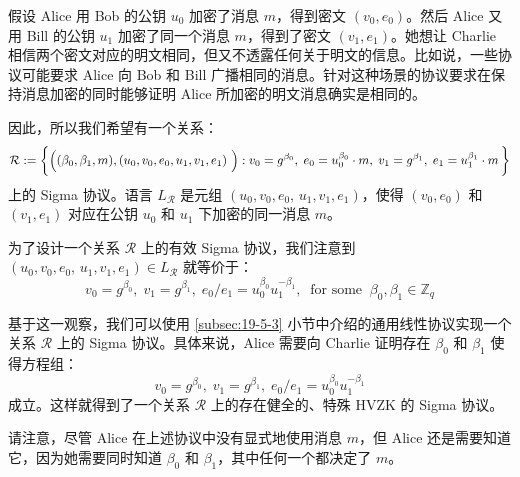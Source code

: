 \begin{example}[明文相等]
假设 Alice 用 Bob 的公钥 $u_0$ 加密了消息 $m$，得到密文 $(v_0,e_0)$。然后 Alice 又用 Bill 的公钥 $u_1$ 加密了同一个消息 $m$，得到了密文 $(v_1,e_1)$。她想让 Charlie 相信两个密文对应的明文相同，但又不透露任何关于明文的信息。比如说，一些协议可能要求 Alice 向 Bob 和 Bill 广播相同的消息。针对这种场景的协议要求在保持消息加密的同时能够证明 Alice 所加密的明文消息确实是相同的。

因此，所以我们希望有一个关系：
$$
\mathcal{R}:=
\bigg\lbrace
\Big(
(\beta_0,\beta_1,m), (u_0,v_0,e_0,u_1,v_1,e_1)
~\Big) :\\
v_0=g^{\beta_0},\;
e_0=u_0^{\beta_0}\cdot m,\;
v_1=g^{\beta_1},\;
e_1=u_1^{\beta_1}\cdot m\,
\bigg\rbrace
$$
上的 Sigma 协议。语言 $L_\mathcal{R}$ 是元组 $(u_0,v_0,e_0,\,u_1,v_1,e_1)$，使得 $(v_0,e_0)$ 和 $(v_1,e_1)$ 对应在公钥 $u_0$ 和 $u_1$ 下加密的同一消息 $m$。

为了设计一个关系 $\mathcal{R}$ 上的有效 Sigma 协议，我们注意到 $(u_0,v_0,e_0,\,u_1,v_1,e_1)\in L_\mathcal{R}$ 就等价于：
$$
v_0=g^{\beta_0},\;
v_1=g^{\beta_1},\;
{e_0}/{e_1}=u_0^{\beta_0}u_1^{-\beta_1},\ 
\text{ for some }\ \beta_0,\beta_1\in\mathbb{Z}_q
$$

基于这一观察，我们可以使用 \ref{subsec:19-5-3} 小节中介绍的通用线性协议实现一个关系 $\mathcal{R}$ 上的 Sigma 协议。具体来说，Alice 需要向 Charlie 证明存在 $\beta_0$ 和 $\beta_1$ 使得方程组：
$$
v_0 =g^{β_0},\;
v_1=g^{\beta_1},\;
{e_0}/{e_1}=u_0^{\beta_0}u_1^{-\beta_1}
$$
成立。这样就得到了一个关系 $\mathcal{R}$ 上的存在健全的、特殊 HVZK 的 Sigma 协议。

请注意，尽管 Alice 在上述协议中没有显式地使用消息 $m$，但 Alice 还是需要知道它，因为她需要同时知道 $\beta_0$ 和 $\beta_1$，其中任何一个都决定了 $m$。
\end{example}

